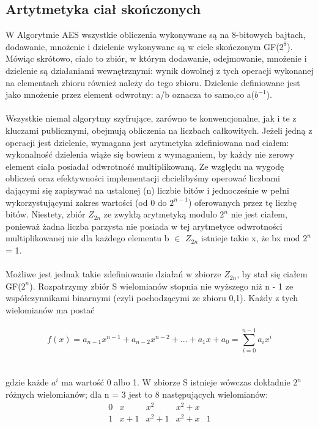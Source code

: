 \documentclass[12pt, letterpaper, titlepage]{article}
\begin{document}
\subsection{Artytmetyka ciał skończonych}
W Algorytmie AES wszystkie obliczenia wykonywane są na 8-bitowych bajtach, dodawanie,
mnożenie i dzielenie wykonywane są w ciele skończonym GF($2^8$). Mówiąc skrótowo, ciało to
zbiór, w którym dodawanie, odejmowanie, mnożenie i dzielenie są działaniami wewnętrznymi:
wynik dowolnej z tych operacji wykonanej na elementach zbioru również należy do tego zbioru.
Dzielenie definiowane jest jako mnożenie przez element odwrotny: a/b oznacza to samo,co a($b^{-1}$).\\
\\
Wszystkie niemal algorytmy szyfrujące, zarówno te konwencjonalne, jak i te z kluczami publicznymi, obejmują obliczenia na liczbach całkowitych. Jeżeli jedną z operacji jest dzielenie, wymagana jest arytmetyka zdefiniowana nad ciałem: wykonalność dzielenia wiąże się bowiem z wymaganiem, by każdy nie zerowy element ciała posiadał odwrotność multiplikowaną. Ze względu na wygodę obliczeń oraz efektywności implementacji chcielibyśmy operować liczbami dającymi się zapisywać na ustalonej (n) liczbie bitów i jednocześnie w pełni wykorzystującymi zakres wartości (od 0 do $2^{n-1}$) oferowanych przez tę liczbę bitów. Niestety, zbiór $Z_{2n}$ ze zwykłą arytmetyką modulo $2^n$ nie jest ciałem, ponieważ żadna liczba parzysta nie posiada w tej arytmetyce odwrotności multiplikowanej nie dla każdego elementu b $\in$ $Z_{2n}$ istnieje takie x, że bx mod $2^n$ = 1.\\
\\
Możliwe jest jednak takie zdefiniowanie działań w zbiorze $Z_{2n}$, by stał się ciałem GF($2^n$). Rozpatrzymy zbiór S wielomianów stopnia nie wyższego niż n - 1 ze współczynnikami binarnymi (czyli pochodzącymi ze zbioru {0,1}). Każdy z tych wielomianów ma postać\\
\\
$$f(x) = a_{n-1}x^{n-1} + a_{n-2}x^{n-2} + ... + a_{1}x + a_{0} = \sum^{n-1}_{i=0}a_{i}x^{i}$$\\
\\
gdzie każde $a^i$ ma wartość 0 albo 1. W zbiorze S istnieje wówczas dokładnie $2^n$ różnych wielomianów; dla n = 3 jest to 8 następujących wielomianów:
$$
\begin{array}{llllll}
0 & x & x^2 & x^2 + x & \\
1 & x + 1 & x^2 + 1 & x^2 + x & 1\\
\end{array}$$\\
\end{document}
